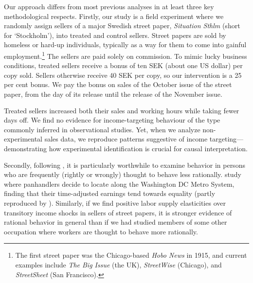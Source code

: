 \documentclass[12pt]{article}
\begin{document}
Our approach differs from most previous analyses in at least three key methodological respects. Firstly, our study is a field experiment where we randomly assign sellers of a major Swedish street paper, \textit{Situation Sthlm} (short for ‘Stockholm’), into treated and control sellers. Street papers are sold by homeless or hard-up individuals, typically as a way for them to come into gainful employment.\footnote{The first street paper was the Chicago-based \textit{Hobo News} in 1915, and current examples include \textit{The Big Issue} (the UK), \textit{StreetWise} (Chicago), and \textit{StreetSheet} (San Francisco).} The sellers are paid solely on commission. To mimic lucky business conditions, treated sellers receive a bonus of ten SEK (about one US dollar) per copy sold. Sellers otherwise receive 40 SEK per copy, so our intervention is a 25 per cent bonus. We pay the bonus on sales of the October issue of the street paper, from the day of its release until the release of the November issue.

Treated sellers increased both their sales and working hours while taking fewer days off. We find no evidence for income-targeting behaviour of the type commonly inferred in observational studies. Yet, when we analyze non-experimental sales data, we reproduce patterns suggestive of income targeting—demonstrating how experimental identification is crucial for causal interpretation.

Secondly, following \citet{leeson2022hobo}, it is particularly worthwhile to examine behavior in persons who are frequently (rightly or wrongly) thought to behave less rationally. \citet{leeson2022hobo} study where panhandlers decide to locate along the Washington DC Metro System, finding that their time-adjusted earnings tend towards equality (partly reproduced by \citet{demeloetalreplication}). Similarly, if we find positive labor supply elasticities over transitory income shocks in sellers of street papers, it is stronger evidence of rational behavior in general than if we had studied members of some other occupation where workers are thought to behave more rationally.
\end{document}
